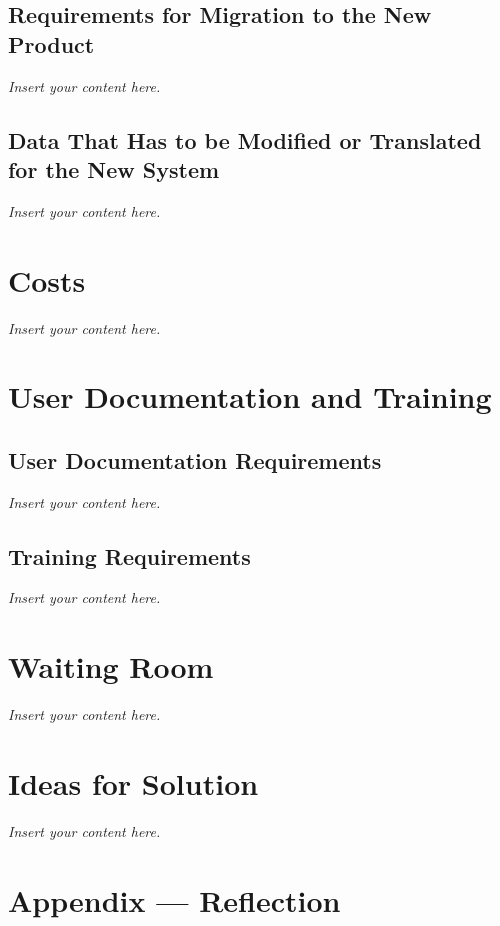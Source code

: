 \documentclass[12pt]{article}
\newcommand{\lips}{\textit{Insert your content here.}}
\begin{document}
\subsection{Requirements for Migration to the New Product}
\lips
\subsection{Data That Has to be Modified or Translated for the New System}
\lips

\section{Costs}
\lips
\section{User Documentation and Training}
\subsection{User Documentation Requirements}
\lips
\subsection{Training Requirements}
\lips

\section{Waiting Room}
\lips

\section{Ideas for Solution}
\lips

\newpage{}
\section*{Appendix --- Reflection}




\end{document}
